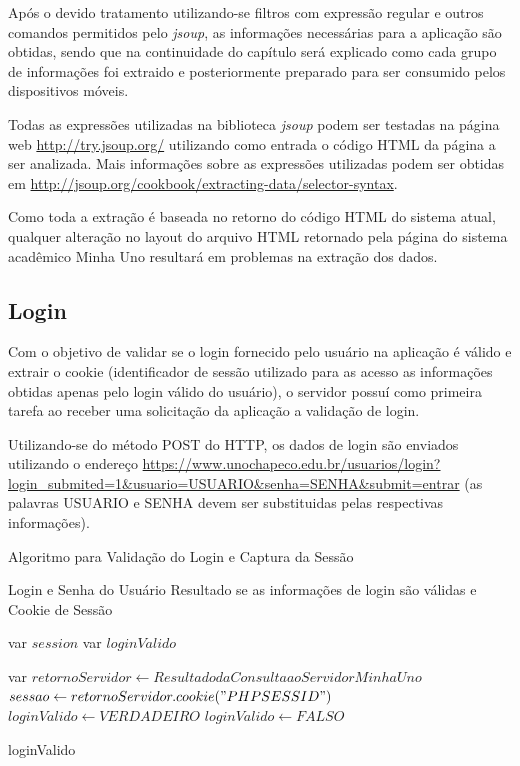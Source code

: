 Após o devido tratamento utilizando-se filtros com expressão regular e outros comandos permitidos pelo \emph{jsoup}, as informações necessárias para a aplicação são obtidas, sendo que na continuidade do capítulo será explicado como cada grupo de informações foi extraido e posteriormente preparado para ser consumido pelos dispositivos móveis.

Todas as expressões utilizadas na biblioteca \emph{jsoup} podem ser testadas na página web \url{http://try.jsoup.org/} utilizando como entrada o código HTML da página a ser analizada. Mais informações sobre as expressões utilizadas podem ser obtidas em \url{http://jsoup.org/cookbook/extracting-data/selector-syntax}.

Como toda a extração é baseada no retorno do código HTML do sistema atual, qualquer alteração no layout do arquivo HTML retornado pela página do sistema acadêmico Minha Uno resultará em problemas na extração dos dados.


\subsection{Login}
Com o objetivo de validar se o login fornecido pelo usuário na aplicação é válido e extrair o cookie (identificador de sessão utilizado para as acesso as informações obtidas apenas pelo login válido do usuário), o servidor possuí como primeira tarefa ao receber uma solicitação da aplicação a validação de login.

Utilizando-se do método POST do HTTP, os dados de login são enviados utilizando o endereço \url{https://www.unochapeco.edu.br/usuarios/login?login_submited=1&usuario=USUARIO&senha=SENHA&submit=entrar} (as palavras USUARIO e SENHA devem ser substituidas pelas respectivas informações).

\begin{algorithm}
\caption{Algoritmo para Validação do Login e Captura da Sessão}
\label{alg:frw}
\begin{algorithmic}[1]
\REQUIRE Login e Senha do Usuário
\ENSURE Resultado se as informações de login são válidas e Cookie de Sessão

\STATE var $session$
\STATE var $loginValido$

\STATE var $retornoServidor \gets Resultado da Consulta ao Servidor Minha Uno$
\STATE $sessao \gets retornoServidor.cookie("PHPSESSID")$
    \STATE $loginValido \gets VERDADEIRO$
\ELSE
   \STATE $loginValido \gets FALSO$
\ENDIF

\RETURN loginValido
\end{algorithmic}
\end{algorithm}

